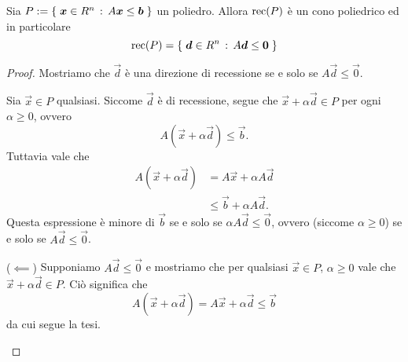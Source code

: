 \begin{proposition}
    Sia $P := \left\{\;\bm{x} \in R^n \,:\, A\bm{x} \leq \bm{b}\;\right\}$ un poliedro. Allora $\operatorname{rec}(P)$ è un cono poliedrico ed in particolare \begin{equation}
        \operatorname{rec}(P) = \left\{\;\bm{d} \in R^n \,:\, A\bm{d} \leq \bm{0}\;\right\}
    \end{equation}
\end{proposition}
\begin{proof}
    Mostriamo che $\vec d$ è una direzione di recessione se e solo se $A\vec d \leq \vec 0$.
    \begin{description}
        \item[($\implies$)] Sia $\vec x \in P$ qualsiasi. Siccome $\vec d$ è di recessione, segue che $\vec x + \alpha\vec d \in P$ per ogni $\alpha \geq 0$, ovvero \[
            A(\vec x + \alpha\vec d) \leq \vec b.
        \]
        Tuttavia vale che \begin{align*}
            A(\vec x + \alpha\vec d) &= A\vec x + \alpha A\vec d \tag{$A\vec x \leq \vec b$}\\
            &\leq \vec b + \alpha A\vec d.
        \end{align*} 
        Questa espressione è minore di $\vec b$ se e solo se $\alpha A\vec d \leq \vec 0$, ovvero (siccome $\alpha \geq 0$) se e solo se $A\vec d \leq \vec 0$.
        \item{($\impliedby$)} Supponiamo $A\vec d \leq \vec 0$ e mostriamo che per qualsiasi $\vec x \in P$, $\alpha \geq 0$ vale che $\vec x + \alpha\vec d \in P$. Ciò significa che \[
            A(\vec x + \alpha\vec d) = A\vec x + \alpha\vec d \leq \vec b  
        \] da cui segue la tesi. \qedhere
    \end{description}
\end{proof}